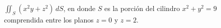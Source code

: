 \item $\iint_S (x^2y + z^2) \, dS$, en donde $S$ es la porción del cilindro $x^2 + y^2 = 9$ comprendida entre los planos $z = 0$ y $z = 2$.
